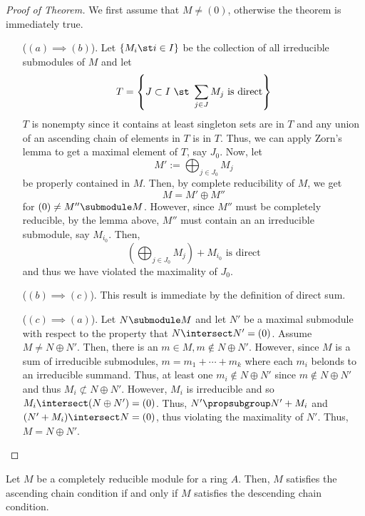 \documentclass[11pt,leqno,oneside]{amsbook}
\numberwithin{thm}{section}
\begin{document}
\begin{proof}[Proof of Theorem]
  We first assume that \(M \neq (0)\), otherwise the theorem is
  immediately true.
  \begin{enumerate}
  \item[(\((a) \implies (b)\)).] Let \(\{M_i \st i \in I\}\) be the
    collection of all irreducible submodules of \(M\) and let \[
      T = \left\{J \subset I \ \st \ \sum_{j \in J} M_j \text{
          is direct} \right\}
    \]
    \(T\) is nonempty since it contains at least singleton sets are in
    \(T\) and any union
    of an ascending chain of elements in \(T\) is in \(T\). Thus, we
    can apply Zorn's lemma to get a maximal element of \(T\), say
    \(J_0\). Now, let \[
      M' := \bigoplus_{j \in J_0} M_j
    \]
    be properly contained in \(M\). Then, by complete reducibility of
    \(M\), we get \[
      M = M' \oplus M''
    \]
    for \((0) \neq M'' \submodule M\). However, 
    since \(M''\) must be completely reducible, by the lemma above,
    \(M''\) must contain an an irreducible submodule, say
    \(M_{i_0}\). Then, \[
      \left(\bigoplus_{j \in J_0} M_j \right) + M_{i_0} \text{ is direct}
    \]
    and thus we have violated the maximality of \(J_0\).
  \item[(\((b) \implies (c)\)).] This result is immediate by the
    definition of direct sum.
  \item[(\((c) \implies (a)\)).] Let \(N \submodule M\) and let \(N'\)
    be a maximal submodule with respect to the property that \(N
    \intersect N' = (0)\). Assume \(M \neq N \oplus N'\). Then, there
    is an \(m \in M, m \not \in N \oplus N'\). However, since \(M\) is
    a sum of irreducible submodules, \(m = m_1 + \cdots + m_k\) where
    each \(m_i\) belonds to an irreducible summand. Thus, at least one
    \(m_i \not \in N \oplus N'\) since \(m \not \in N \oplus N'\) and
    thus \(M_i \not \subset N \oplus N'\). However, \(M_i\) is
    irreducible and so \(M_i \intersect (N \oplus N') = (0)\). Thus,
    \(N' \propsubgroup N' + M_i\) and \((N'+M_i) \intersect N = (0)\),
    thus violating the maximality of \(N'\). Thus, \(M = N \oplus N'\).
  \end{enumerate}
\end{proof}
\begin{prop}
  Let \(M\) be a completely reducible module for a ring \(A\). Then,
  \(M\) satisfies the ascending chain condition if and only if \(M\)
  satisfies the descending chain condition.
\end{prop}
\end{document}
